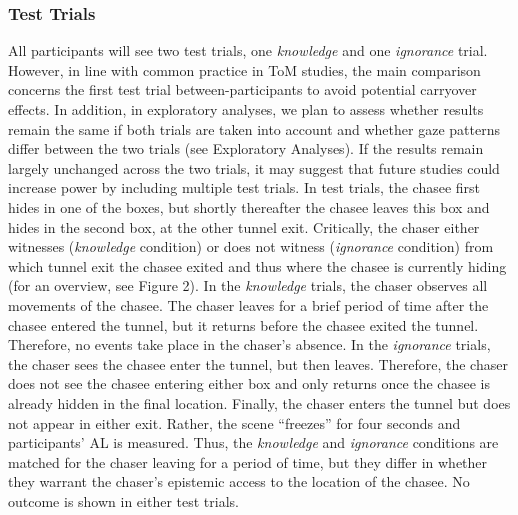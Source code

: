 \documentclass[
  man,floatsintext]{apa6}
\begin{document}
\subsubsection{Test Trials}\label{test-trials}

All participants will see two test trials, one \emph{knowledge} and one \emph{ignorance} trial. However, in line with common practice in ToM studies, the main comparison concerns the first test trial between-participants to avoid potential carryover effects. In addition, in exploratory analyses, we plan to assess whether results remain the same if both trials are taken into account and whether gaze patterns differ between the two trials (see Exploratory Analyses). If the results remain largely unchanged across the two trials, it may suggest that future studies could increase power by including multiple test trials.
In test trials, the chasee first hides in one of the boxes, but shortly thereafter the chasee leaves this box and hides in the second box, at the other tunnel exit. Critically, the chaser either witnesses (\emph{knowledge} condition) or does not witness (\emph{ignorance} condition) from which tunnel exit the chasee exited and thus where the chasee is currently hiding (for an overview, see Figure 2). In the \emph{knowledge} trials, the chaser observes all movements of the chasee. The chaser leaves for a brief period of time after the chasee entered the tunnel, but it returns before the chasee exited the tunnel. Therefore, no events take place in the chaser's absence. In the \emph{ignorance} trials, the chaser sees the chasee enter the tunnel, but then leaves. Therefore, the chaser does not see the chasee entering either box and only returns once the chasee is already hidden in the final location. Finally, the chaser enters the tunnel but does not appear in either exit. Rather, the scene ``freezes'' for four seconds and participants' AL is measured. Thus, the \emph{knowledge} and \emph{ignorance} conditions are matched for the chaser leaving for a period of time, but they differ in whether they warrant the chaser's epistemic access to the location of the chasee. No outcome is shown in either test trials.
\end{document}
